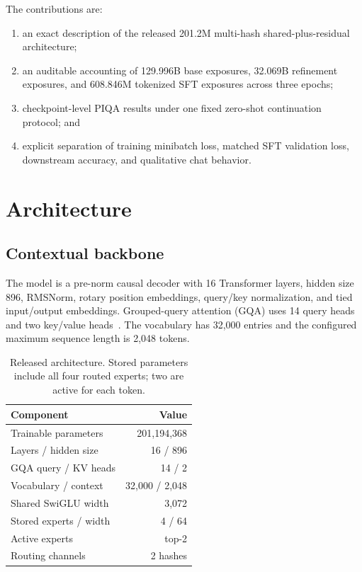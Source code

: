 \documentclass[10pt,twocolumn]{article}
\begin{document}
The contributions are:
\begin{enumerate}
  \item an exact description of the released 201.2M multi-hash shared-plus-residual architecture;
  \item an auditable accounting of 129.996B base exposures, 32.069B refinement exposures, and 608.846M tokenized SFT exposures across three epochs;
  \item checkpoint-level PIQA results under one fixed zero-shot continuation protocol; and
  \item explicit separation of training minibatch loss, matched SFT validation loss, downstream accuracy, and qualitative chat behavior.
\end{enumerate}

\section{Architecture}
\subsection{Contextual backbone}
The model is a pre-norm causal decoder with 16 Transformer layers, hidden size 896, RMSNorm, rotary position embeddings, query/key normalization, and tied input/output embeddings. Grouped-query attention (GQA) uses 14 query heads and two key/value heads~\cite{ainslie2023gqa,su2021roformer}. The vocabulary has 32,000 entries and the configured maximum sequence length is 2,048 tokens.

\begin{table}[t]
\centering
\caption{Released architecture. Stored parameters include all four routed experts; two are active for each token.}
\label{tab:architecture}
\small
\begin{tabular}{@{}lr@{}}
\toprule
Component & Value \\
\midrule
Trainable parameters & 201,194,368 \\
Layers / hidden size & 16 / 896 \\
GQA query / KV heads & 14 / 2 \\
Vocabulary / context & 32,000 / 2,048 \\
Shared SwiGLU width & 3,072 \\
Stored experts / width & 4 / 64 \\
Active experts & top-2 \\
Routing channels & 2 hashes \\
\bottomrule
\end{tabular}
\end{table}
\end{document}
